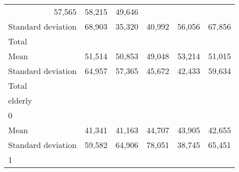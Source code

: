 \begin{tabular}{llllll}
  \multicolumn{1}{r}{57,565} &
  \multicolumn{1}{r}{58,215} &
  \multicolumn{1}{r}{49,646} \\
\multicolumn{1}{l}{\hspace{4em}Standard deviation} &
  \multicolumn{1}{|r}{68,903} &
  \multicolumn{1}{r}{35,320} &
  \multicolumn{1}{r}{40,992} &
  \multicolumn{1}{r}{56,056} &
  \multicolumn{1}{r}{67,856} \\
\multicolumn{1}{l}{\hspace{3em}Total} &
  \multicolumn{1}{|r}{} &
  \multicolumn{1}{r}{} &
  \multicolumn{1}{r}{} &
  \multicolumn{1}{r}{} &
  \multicolumn{1}{r}{} \\
\multicolumn{1}{l}{\hspace{4em}Mean} &
  \multicolumn{1}{|r}{51,514} &
  \multicolumn{1}{r}{50,853} &
  \multicolumn{1}{r}{49,048} &
  \multicolumn{1}{r}{53,214} &
  \multicolumn{1}{r}{51,015} \\
\multicolumn{1}{l}{\hspace{4em}Standard deviation} &
  \multicolumn{1}{|r}{64,957} &
  \multicolumn{1}{r}{57,365} &
  \multicolumn{1}{r}{45,672} &
  \multicolumn{1}{r}{42,433} &
  \multicolumn{1}{r}{59,634} \\
\multicolumn{1}{l}{\hspace{1em}Total} &
  \multicolumn{1}{|r}{} &
  \multicolumn{1}{r}{} &
  \multicolumn{1}{r}{} &
  \multicolumn{1}{r}{} &
  \multicolumn{1}{r}{} \\
\multicolumn{1}{l}{\hspace{2em}elderly} &
  \multicolumn{1}{|r}{} &
  \multicolumn{1}{r}{} &
  \multicolumn{1}{r}{} &
  \multicolumn{1}{r}{} &
  \multicolumn{1}{r}{} \\
\multicolumn{1}{l}{\hspace{3em}0} &
  \multicolumn{1}{|r}{} &
  \multicolumn{1}{r}{} &
  \multicolumn{1}{r}{} &
  \multicolumn{1}{r}{} &
  \multicolumn{1}{r}{} \\
\multicolumn{1}{l}{\hspace{4em}Mean} &
  \multicolumn{1}{|r}{41,341} &
  \multicolumn{1}{r}{41,163} &
  \multicolumn{1}{r}{44,707} &
  \multicolumn{1}{r}{43,905} &
  \multicolumn{1}{r}{42,655} \\
\multicolumn{1}{l}{\hspace{4em}Standard deviation} &
  \multicolumn{1}{|r}{59,582} &
  \multicolumn{1}{r}{64,906} &
  \multicolumn{1}{r}{78,051} &
  \multicolumn{1}{r}{38,745} &
  \multicolumn{1}{r}{65,451} \\
\multicolumn{1}{l}{\hspace{3em}1} &

\end{tabular}
